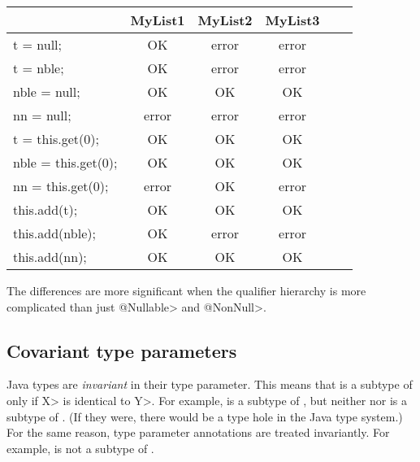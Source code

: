 \begin{tabular}{|l|c|c|c|c|c|} \hline
                        & MyList1 & MyList2 & MyList3 \\ \hline
  t = null;             & OK      & error   & error   \\ \hline
  t = nble;             & OK      & error   & error   \\ \hline
  nble = null;          & OK      & OK      & OK      \\ \hline
  nn = null;            & error   & error   & error   \\ \hline
  t = this.get(0);      & OK      & OK      & OK      \\ \hline
  nble = this.get(0);   & OK      & OK      & OK      \\ \hline
  nn = this.get(0);     & error   & OK      & error   \\ \hline
  this.add(t);          & OK      & OK      & OK      \\ \hline
  this.add(nble);       & OK      & error   & error   \\ \hline
  this.add(nn);         & OK      & OK      & OK      \\ \hline
\end{tabular}


The differences are more
significant when the qualifier hierarchy is more complicated than just
\<@Nullable> and \<@NonNull>.

\subsection{Covariant type parameters\label{covariant-type-parameters}}

Java types are \emph{invariant} in their type parameter.  This means that
 is a subtype of  only if \<X> is identical to \<Y>.  For
example,  is a subtype of , but
neither  nor  is a subtype of
.  (If they were, there would be a type hole in the Java
type system.)  For the same reason, type parameter annotations are treated
invariantly.  For example,  is not a subtype
of .

